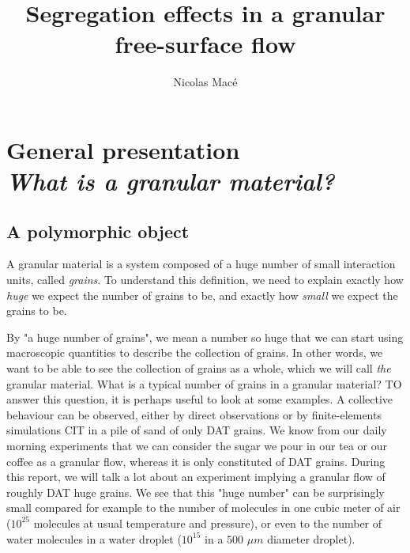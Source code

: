\documentclass[11pt,a4paper]{report}
\author{Nicolas Macé}
\title{Segregation effects in a granular free-surface flow}
\newcommand\Chapter[2]{
  \chapter[#1: {\itshape#2}]{#1\\[2ex]\Large\itshape#2}
}
\begin{document}
\Chapter{General presentation}{What is a granular material?}

\section{A polymorphic object}

A granular material is a system composed of a huge number of small interaction units, called \textit{grains}. 
To understand this definition, we need to explain exactly how \textit{huge} we expect the number of grains to be, and exactly how \textit{small} we expect the grains to be.

By "a huge number of grains", we mean a number so huge that we can start using macroscopic quantities to describe the collection of grains. In other words, we want to be able to see the collection of grains as a whole, which we will call \textit{the} granular material.
What is a typical number of grains in a granular material? TO answer this question, it is perhaps useful to look at some examples.
A collective behaviour can be observed, either by direct observations or by finite-elements simulations CIT in a pile of sand of only DAT grains.
We know from our daily morning experiments that we can consider the sugar we pour in our tea or our coffee as a granular flow, whereas it is only constituted of DAT grains.
During this report, we will talk a lot about an experiment implying a granular flow of roughly DAT huge grains.
We see that this "huge number" can be surprisingly small compared for example to the number of molecules in one cubic meter of air ($10^{25}$ molecules at usual temperature and pressure), or even to the number of water molecules in a water droplet ($10^{15}$ in a $500$ $\mu m$ diameter droplet).
\end{document}
